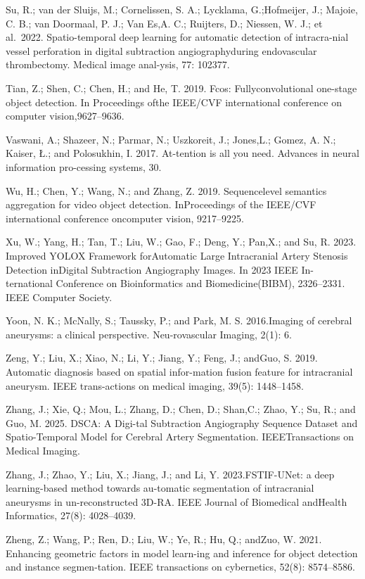 \documentclass[
  10
]{article}
\begin{document}
Su, R.; van der Sluijs, M.; Cornelissen, S. A.; Lycklama, G.;Hofmeijer,
J.; Majoie, C. B.; van Doormaal, P. J.; Van Es,A. C.; Ruijters, D.;
Niessen, W. J.; et al.~2022. Spatio-temporal deep learning for automatic
detection of intracra-nial vessel perforation in digital subtraction
angiographyduring endovascular thrombectomy. Medical image anal-ysis,
77: 102377.

Tian, Z.; Shen, C.; Chen, H.; and He, T. 2019. Fcos: Fullyconvolutional
one-stage object detection. In Proceedings ofthe IEEE/CVF international
conference on computer vision,9627--9636.

Vaswani, A.; Shazeer, N.; Parmar, N.; Uszkoreit, J.; Jones,L.; Gomez, A.
N.; Kaiser, Ł.; and Polosukhin, I. 2017. At-tention is all you need.
Advances in neural information pro-cessing systems, 30.

Wu, H.; Chen, Y.; Wang, N.; and Zhang, Z. 2019. Sequencelevel semantics
aggregation for video object detection. InProceedings of the IEEE/CVF
international conference oncomputer vision, 9217--9225.

Xu, W.; Yang, H.; Tan, T.; Liu, W.; Gao, F.; Deng, Y.; Pan,X.; and Su,
R. 2023. Improved YOLOX Framework forAutomatic Large Intracranial Artery
Stenosis Detection inDigital Subtraction Angiography Images. In 2023
IEEE In-ternational Conference on Bioinformatics and Biomedicine(BIBM),
2326--2331. IEEE Computer Society.

Yoon, N. K.; McNally, S.; Taussky, P.; and Park, M. S. 2016.Imaging of
cerebral aneurysms: a clinical perspective. Neu-rovascular Imaging,
2(1): 6.

Zeng, Y.; Liu, X.; Xiao, N.; Li, Y.; Jiang, Y.; Feng, J.; andGuo, S.
2019. Automatic diagnosis based on spatial infor-mation fusion feature
for intracranial aneurysm. IEEE trans-actions on medical imaging, 39(5):
1448--1458.

Zhang, J.; Xie, Q.; Mou, L.; Zhang, D.; Chen, D.; Shan,C.; Zhao, Y.; Su,
R.; and Guo, M. 2025. DSCA: A Digi-tal Subtraction Angiography Sequence
Dataset and Spatio-Temporal Model for Cerebral Artery Segmentation.
IEEETransactions on Medical Imaging.

Zhang, J.; Zhao, Y.; Liu, X.; Jiang, J.; and Li, Y. 2023.FSTIF-UNet: a
deep learning-based method towards au-tomatic segmentation of
intracranial aneurysms in un-reconstructed 3D-RA. IEEE Journal of
Biomedical andHealth Informatics, 27(8): 4028--4039.

Zheng, Z.; Wang, P.; Ren, D.; Liu, W.; Ye, R.; Hu, Q.; andZuo, W. 2021.
Enhancing geometric factors in model learn-ing and inference for object
detection and instance segmen-tation. IEEE transactions on cybernetics,
52(8): 8574--8586.
\end{document}
